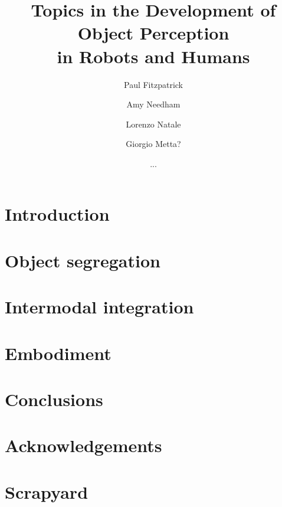 \documentclass[a4]{epirob}
\title{
Topics in the Development of Object Perception \\ in Robots and Humans
}
\author{Paul Fitzpatrick  \and Amy Needham \and Lorenzo Natale \and
\and Giorgio Metta? \and ...}
\begin{document}
\maketitle


\begin{abstract}

\end{abstract}


\section{Introduction}




\section{Object segregation}




\section{Intermodal integration}






\section{Embodiment}





%



\section{Conclusions}




\section*{Acknowledgements}





\nocite{natale05developmental}
\nocite{arsenio05exploiting}




\section*{Scrapyard}


\end{document}
